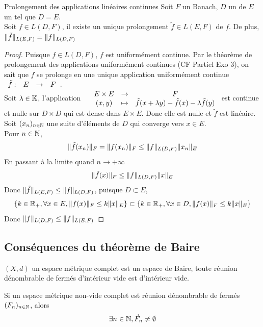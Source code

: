 \documentclass[]{report}
\begin{document}
    \begin{tm}{Prolongement des applications linéaires continues}{}
        Soit $F$ un Banach, $D$ un \sev de $E$ un \evn tel que $\overline{D}=E$.\\
        Soit $f\in L(D,F)$, il existe un unique prolongement $\tilde{f}\in L(E,F)$ de $f$. De plus, $\lVert \tilde{f} \rVert_{L(E,F)}=\lVert f \rVert_{L(D,F)}$
    \end{tm}

    \begin{proof}
        Puisque $f\in L(D,F)$, $f$ est uniformément continue. Par le théorème de prolongement des applications uniformément continues (CF Partiel Exo 3), on sait que $f$ se prolonge en une unique application uniformément continue $\begin{array}{ccccc} \tilde{f} : & E & \to & F \end{array}$.\\
        Soit $\lambda \in \mathbb{K}$, l'application $\begin{array}{ccccc} & E\times E & \to & F \\ & (x,y) & \mapsto & \tilde{f}(x+\lambda y)-\tilde{f}(x)-\lambda \tilde{f}(y) \end{array}$ est continue et nulle sur $D\times D$ qui est dense dans $E\times E$. Donc elle est nulle et $\tilde{f}$ est linéaire.\\
        Soit $(x_n)_{n\in\mathbb{N}}$ une suite d'éléments de $D$ qui converge vers $x\in E$.\\
        Pour ${n\in\mathbb{N}}$,
        \[\lVert \tilde{f}(x_n) \rVert_F=\lVert f(x_n) \rVert_F\le \lVert f \rVert_{L(D,F)}\lVert x_n \rVert_E\]
        En passant à la limite quand $n\to +\infty$
        \[\lVert \tilde{f}(x) \rVert_F\le \lVert f \rVert_{L(D,F)}\lVert x \rVert_E\]
        Donc $\lVert \tilde{f} \rVert_{L(E,F)}\le \lVert f \rVert_{L(D,F)}$, puisque $D\subset E$,
        \[\{k\in \mathbb{R}_+,\forall x\in E,\lVert f(x) \rVert_F\le k\lVert x \rVert_E\}\subset \{k\in \mathbb{R}_+,\forall x\in D, \lVert f(x) \rVert_F\le k\lVert x \rVert_E\}\]
        Donc $\lVert f \rVert_{L(D,F)}\le \lVert f \rVert_{L(E,F)}$
    \end{proof}

    \subsection*{Conséquences du théorème de Baire}

    \begin{ra}{}{}
        $(X,d)$ un espace métrique complet est un espace de Baire, toute réunion dénombrable de fermés d'intérieur vide est d'intérieur vide.
    \end{ra}

    \begin{cor}{}{}
        Si un espace métrique non-vide complet est réunion dénombrable de fermés $(F_n)_{n\in\mathbb{N}}$, alors
        \[\exists n\in \mathbb{N}, \mathring{F_n}\neq \emptyset\]
    \end{cor}
\end{document}
